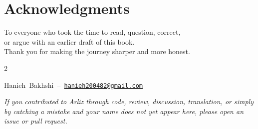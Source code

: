 \chapter*{Acknowledgments}
\thispagestyle{empty}

\vspace*{1cm}

\begin{center}
	\large
	To everyone who took the time to read, question, correct,\\
	or argue with an earlier draft of this book.\\
	Thank you for making the journey sharper and more honest.
\end{center}

\vspace{0.6cm}

\begingroup
\footnotesize
\setlength{\parindent}{0pt}
\setlength{\parskip}{0pt}
\setlength{\columnsep}{1.2em}

\begin{multicols}{2}
	\raggedright
	\raggedcolumns
	\newcommand{\AckEmail}[2]{\mbox{#1 -- \href{mailto:#2}{\texttt{#2}}}\par}
	\newcommand{\AckGitHub}[2]{\mbox{#1 -- \href{#2}{\texttt{#2}}}\par}
	\newcommand{\AckName}[1]{\mbox{#1}\par}
	
	\AckEmail{Hanieh Bakhshi}{hanieh200482@gmail.com}
	
\end{multicols}
\endgroup

\vfill

\begin{center}
	\small\textit{
		If you contributed to Arliz through code, review, discussion, translation,
		or simply by catching a mistake and your name does not yet appear here,
		please open an issue or pull request.
	}
\end{center}

\clearpage
